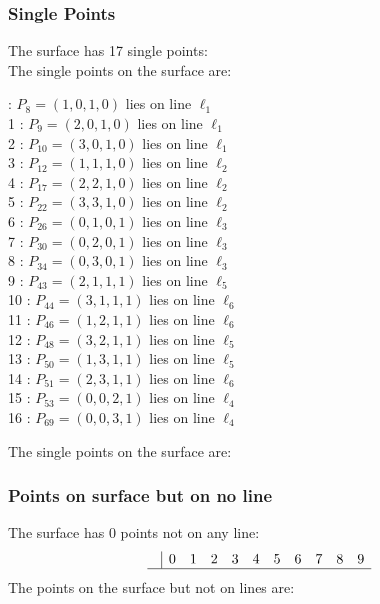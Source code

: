 \documentclass{article}
\begin{document}
{\subsubsection*{Single Points}
The surface has 17 single points:\\
The single points on the surface are:\\
\begin{multicols}{2}
 : $P_{8}=( 1, 0, 1, 0 )$ lies on line $\ell_{1}$\\
1 : $P_{9}=( 2, 0, 1, 0 )$ lies on line $\ell_{1}$\\
2 : $P_{10}=( 3, 0, 1, 0 )$ lies on line $\ell_{1}$\\
3 : $P_{12}=( 1, 1, 1, 0 )$ lies on line $\ell_{2}$\\
4 : $P_{17}=( 2, 2, 1, 0 )$ lies on line $\ell_{2}$\\
5 : $P_{22}=( 3, 3, 1, 0 )$ lies on line $\ell_{2}$\\
6 : $P_{26}=( 0, 1, 0, 1 )$ lies on line $\ell_{3}$\\
7 : $P_{30}=( 0, 2, 0, 1 )$ lies on line $\ell_{3}$\\
8 : $P_{34}=( 0, 3, 0, 1 )$ lies on line $\ell_{3}$\\
9 : $P_{43}=( 2, 1, 1, 1 )$ lies on line $\ell_{5}$\\
10 : $P_{44}=( 3, 1, 1, 1 )$ lies on line $\ell_{6}$\\
11 : $P_{46}=( 1, 2, 1, 1 )$ lies on line $\ell_{6}$\\
12 : $P_{48}=( 3, 2, 1, 1 )$ lies on line $\ell_{5}$\\
13 : $P_{50}=( 1, 3, 1, 1 )$ lies on line $\ell_{5}$\\
14 : $P_{51}=( 2, 3, 1, 1 )$ lies on line $\ell_{6}$\\
15 : $P_{53}=( 0, 0, 2, 1 )$ lies on line $\ell_{4}$\\
16 : $P_{69}=( 0, 0, 3, 1 )$ lies on line $\ell_{4}$\\
\end{multicols}
The single points on the surface are:\\
\subsubsection*{Points on surface but on no line}
The surface has 0 points not on any line:\\
$$
\begin{array}{r|*{10}{r}}
 & 0 & 1 & 2 & 3 & 4 & 5 & 6 & 7 & 8 & 9\\
\hline
\end{array}
$$
The points on the surface but not on lines are:\\
\begin{multicols}{2}
\noindent
\end{multicols}
}
\end{document}
